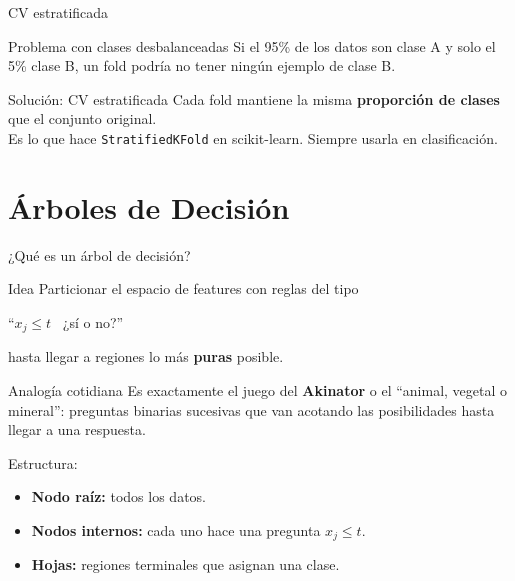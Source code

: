 \documentclass[aspectratio=169]{beamer}
\begin{document}
\begin{frame}{CV estratificada}
  \begin{block}{Problema con clases desbalanceadas}
    Si el 95\% de los datos son clase A y solo el 5\% clase B,
    un fold podría no tener ningún ejemplo de clase B.
  \end{block}

  \medskip
  \begin{exampleblock}{Solución: CV estratificada}
    Cada fold mantiene la misma \textbf{proporción de clases} que el conjunto original.\\[4pt]
    Es lo que hace \texttt{StratifiedKFold} en scikit-learn.
    Siempre usarla en clasificación.
  \end{exampleblock}
\end{frame}

\section{Árboles de Decisión}

\begin{frame}{¿Qué es un árbol de decisión?}
  \begin{block}{Idea}
    Particionar el espacio de features con reglas del tipo\\
    \centerline{``$x_j \leq t$ \, ¿sí o no?''}
    hasta llegar a regiones lo más \textbf{puras} posible.
  \end{block}

  \medskip
  \begin{exampleblock}{Analogía cotidiana}
    Es exactamente el juego del \textbf{Akinator} o el ``animal, vegetal o mineral'':
    preguntas binarias sucesivas que van acotando las posibilidades
    hasta llegar a una respuesta.
  \end{exampleblock}

  \medskip
  Estructura:
  \begin{itemize}
    \item \textbf{Nodo raíz:} todos los datos.
    \item \textbf{Nodos internos:} cada uno hace una pregunta $x_j \leq t$.
    \item \textbf{Hojas:} regiones terminales que asignan una clase.
  \end{itemize}
\end{frame}
\end{document}
